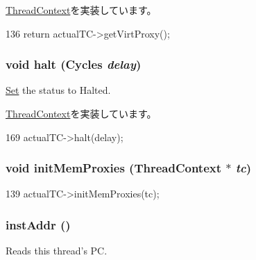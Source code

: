 \hyperlink{classThreadContext_a55e3a4b93d5f1ad641247f6d223191c6}{ThreadContext}を実装しています。


\begin{DoxyCode}
136     { return actualTC->getVirtProxy(); }
\end{DoxyCode}
\hypertarget{classCheckerThreadContext_aacddd436c183735798f7c5abbb7d6824}{
\subsubsection[{halt}]{\setlength{\rightskip}{0pt plus 5cm}void halt ({\bf Cycles} {\em delay})}}
\label{classCheckerThreadContext_aacddd436c183735798f7c5abbb7d6824}


\hyperlink{classSet}{Set} the status to Halted. 

\hyperlink{classThreadContext_a1cf6e868fcd49300a04acd0cae4fd142}{ThreadContext}を実装しています。


\begin{DoxyCode}
169 { actualTC->halt(delay); }
\end{DoxyCode}
\hypertarget{classCheckerThreadContext_ab24719c7923d7d57030fa05bb166c62c}{
\subsubsection[{initMemProxies}]{\setlength{\rightskip}{0pt plus 5cm}void initMemProxies ({\bf ThreadContext} $\ast$ {\em tc})}}
\label{classCheckerThreadContext_ab24719c7923d7d57030fa05bb166c62c}



\begin{DoxyCode}
139     { actualTC->initMemProxies(tc); }
\end{DoxyCode}
\hypertarget{classCheckerThreadContext_a53c92716db281ae16ffb693c6d7803c7}{
\subsubsection[{instAddr}]{ instAddr ()}}
\label{classCheckerThreadContext_a53c92716db281ae16ffb693c6d7803c7}
Reads this thread's PC. 

